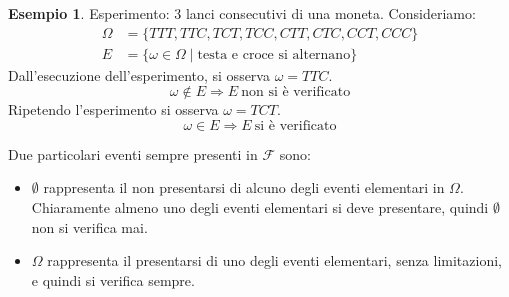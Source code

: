 \documentclass{article}
\theoremstyle{plain}
\theoremstyle{definition}
\newtheorem{esempio}{Esempio}[section]
\theoremstyle{remark}
\begin{document}
\begin{esempio}
	Esperimento: 3 lanci consecutivi di una moneta.
	Consideriamo:
	\begin{align*}
		\Omega&=\{TTT, TTC, TCT, TCC, CTT, CTC, CCT, CCC\}\\
		E&=\{\omega\in\Omega\mid\text{testa e croce si alternano}\}
	\end{align*}
	Dall'esecuzione dell'esperimento, si osserva $\omega=TTC$.
	\begin{equation*}
		\omega\notin E \Rightarrow E\ \text{non si è verificato}
	\end{equation*}
	Ripetendo l'esperimento si osserva $\omega=TCT$.
	\begin{equation*}
		\omega\in E \Rightarrow E\ \text{si è verificato}
	\end{equation*}
\end{esempio}
Due particolari eventi sempre presenti in $\mathscr{F}$ sono:
\begin{itemize}
	\item $\emptyset$ rappresenta il non presentarsi di alcuno degli eventi elementari in $\Omega$. Chiaramente almeno uno degli eventi elementari si deve presentare, quindi $\emptyset$ non si verifica mai.
	\item $\Omega$ rappresenta il presentarsi di uno degli eventi elementari, senza limitazioni, e quindi si verifica sempre.
\end{itemize}
\end{document}
